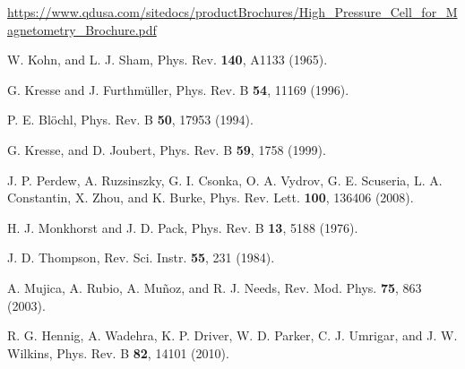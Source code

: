 \documentclass[aps,prb,preprint,groupedaddress,showpacs,amsmath,amssymb]{revtex4}
\begin{document}
\begin{thebibliography}{99}
\url{https://www.qdusa.com/sitedocs/productBrochures/High_Pressure_Cell_for_Magnetometry_Brochure.pdf}

W. Kohn, and L. J. Sham, Phys. Rev. {\bf 140}, A1133 (1965).

G. Kresse and J. Furthm\"uller, Phys. Rev. B {\bf 54}, 11169 (1996).

P. E. Bl\"ochl, Phys. Rev. B {\bf 50}, 17953 (1994).

G. Kresse, and D. Joubert, Phys. Rev. B {\bf 59}, 1758 (1999).

J. P. Perdew, A. Ruzsinszky, G. I. Csonka, O. A. Vydrov, G. E. Scuseria, L. A. Constantin, X. Zhou, and K. Burke, Phys. Rev. Lett. {\bf 100}, 136406 (2008).

H. J. Monkhorst and J. D. Pack, Phys. Rev. B {\bf 13}, 5188 (1976).

J. D. Thompson, Rev. Sci. Instr. {\bf 55}, 231 (1984).

A. Mujica, A. Rubio, A. Mu\~noz, and R. J. Needs, Rev. Mod. Phys. {\bf 75}, 863 (2003).

R. G. Hennig, A. Wadehra, K. P. Driver, W. D. Parker, C. J. Umrigar, and J. W. Wilkins, Phys. Rev. B {\bf 82}, 14101 (2010).




\end{thebibliography}

\clearpage
\end{document}
